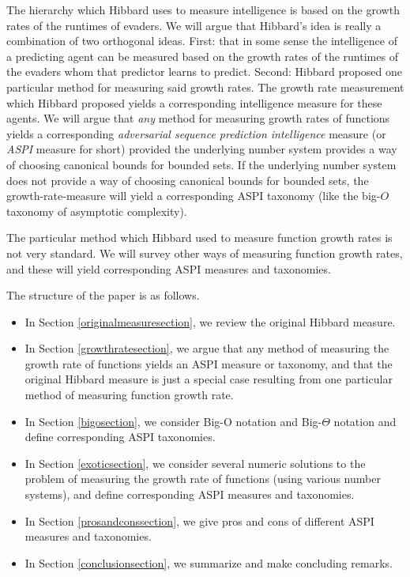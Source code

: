 \documentclass[twoside,11pt]{article}
\begin{document}
The hierarchy which Hibbard uses to measure intelligence is based on the growth
rates of the runtimes of evaders.
We will argue that Hibbard's idea is really a combination of two
orthogonal ideas. First: that in some sense the intelligence of a predicting agent
can be measured based on the growth rates of the runtimes of the evaders whom that
predictor learns to predict. Second: Hibbard proposed one particular method for
measuring said growth rates. The growth rate measurement which Hibbard proposed yields
a corresponding intelligence measure for these agents. We will argue that \emph{any}
method for measuring growth rates of functions yields a corresponding
\emph{adversarial sequence prediction intelligence} measure (or \emph{ASPI} measure
for short) provided the underlying number system provides a way of choosing canonical bounds
for bounded sets. If the underlying number system does not provide a way of choosing
canonical bounds for bounded sets, the growth-rate-measure will yield a corresponding
ASPI taxonomy (like the big-$O$ taxonomy of asymptotic complexity).

The particular method which Hibbard used to measure function growth rates is
not very standard. We will survey other
ways of measuring function growth rates,
and these will yield corresponding ASPI measures and taxonomies.

The structure of the paper is as follows.
\begin{itemize}
    \item
    In Section \ref{originalmeasuresection}, we review the original Hibbard measure.
    \item
    In Section \ref{growthratesection}, we argue that any method of measuring
    the growth rate of functions yields an ASPI measure or taxonomy,
    and that the original Hibbard measure is just a special case resulting from
    one particular method of measuring function growth rate.
    \item
    In Section \ref{bigosection}, we consider Big-O notation and Big-$\Theta$ notation
    and define corresponding ASPI taxonomies.
    \item
    In Section \ref{exoticsection}, we consider several numeric solutions to
    the problem of measuring the growth rate of functions (using various number
    systems), and define
    corresponding ASPI measures and taxonomies.
    \item
    In Section \ref{prosandconssection}, we give pros and cons of different
    ASPI measures and taxonomies.
    \item
    In Section \ref{conclusionsection}, we summarize and make concluding remarks.
\end{itemize}
\end{document}
